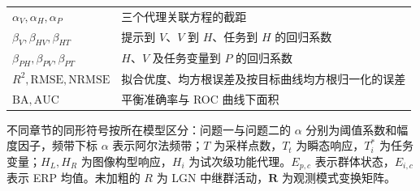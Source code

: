 \begin{longtable}{@{}>{\raggedright\arraybackslash}p{}>{\raggedright\arraybackslash}p{}@{}}
\(\alpha_V,\alpha_H,\alpha_P\) & 三个代理关联方程的截距 \\
\(\beta_V,\beta_{HV},\beta_{HT}\) & 提示到 \(V\)、\(V\) 到 \(H\)、任务到 \(H\) 的回归系数 \\
\(\beta_{PH},\beta_{PV},\beta_{PT}\) & \(H\)、\(V\) 及任务变量到 \(P\) 的回归系数 \\
\(R^2,\mathrm{RMSE},\mathrm{NRMSE}\) & 拟合优度、均方根误差及按目标曲线均方根归一化的误差 \\
\(\mathrm{BA},\mathrm{AUC}\) & 平衡准确率与 ROC 曲线下面积 \\
\end{longtable}
\endgroup

不同章节的同形符号按所在模型区分：问题一与问题二的 \(\alpha\) 分别为阈值系数和幅度因子，频带下标 \(\alpha\) 表示阿尔法频带；\(T\) 为采样点数，\(T_t\) 为瞬态响应，\(T_i^*\) 为任务变量；\(H_L,H_R\) 为图像构型响应，\(H_i\) 为试次级功能代理。\(E_{p,c}\) 表示群体状态，\(E_{i,c}\) 表示 ERP 均值。未加粗的 \(R\) 为 LGN 中继群活动，\(\mathbf R\) 为观测模式变换矩阵。

